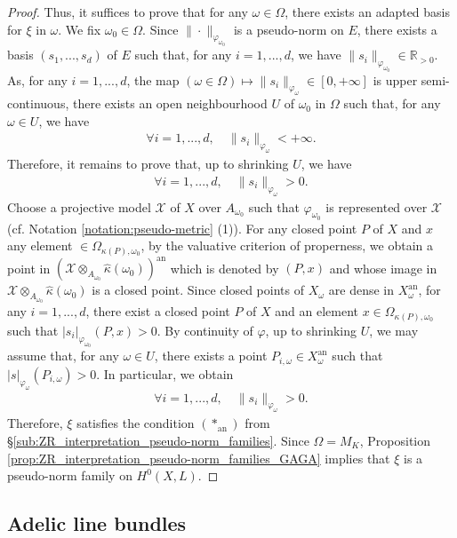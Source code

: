 \documentclass [11pt,reqno]{amsart}
\def\bR{{\mathbb{R}}}
\newcommand{\1}{\mathmybb{1}}
\def\cX{{\mathcal{X}}}
\def\an{\operatorname{an}}
\begin{document}
\begin{proof}
Thus, it suffices to prove that for any $\omega\in\Omega$, there exists an adapted basis for $\xi$ in $\omega$. We fix $\omega_{0}\in\Omega$. Since $\|\cdot\|_{\varphi_{\omega_{0}}}$ is a pseudo-norm on $E$, there exists a basis $(s_1,...,s_d)$ of $E$ such that, for any $i=1,...,d$, we have $\|s_i\|_{\varphi_{\omega_{0}}}\in\bR_{>0}$. As, for any $i=1,...,d$, the map $(\omega\in\Omega)\mapsto \|s_i\|_{\varphi_{\omega}}\in [0,+\infty]$ is upper semi-continuous, there exists an open neighbourhood $U$ of $\omega_{0}$ in $\Omega$ such that, for any $\omega\in U$, we have 
\begin{align*}
\forall i =1,...,d,\quad \|s_i\|_{\varphi_{\omega}} < +\infty.
\end{align*}  
Therefore, it remains to prove that, up to shrinking $U$, we have 
\begin{align*}
\forall i =1,...,d,\quad \|s_i\|_{\varphi_{\omega}} > 0.
\end{align*}
Choose a projective model $\cX$ of $X$ over $A_{\omega_{0}}$ such that $\varphi_{\omega_{0}}$ is represented over $\cX$ (cf. Notation \ref{notation:pseudo-metric} (1)). For any closed point $P$ of $X$ and $x$ any element $\in\Omega_{\kappa(P),\omega_0}$, by the valuative criterion of properness, we obtain a point in $(\cX\otimes_{A_{\omega_{0}}}\widehat{\kappa}(\omega_{0}))^{\an}$ which is denoted by $(P,x)$ and whose image in $\cX\otimes_{A_{\omega_{0}}}\widehat{\kappa}(\omega_{0})$ is a closed point. Since closed points of $X_{\omega}$ are dense in $X_{\omega}^{\an}$, for any $i=1,...,d$, there exist a closed point $P$ of $X$ and an element $x\in\Omega_{\kappa(P),\omega_0}$ such that $|s_i|_{\varphi_{\omega_{0}}}(P,x)>0$. By continuity of $\varphi$, up to shrinking $U$, we may assume that, for any $\omega\in U$, there exists a point $P_{i,\omega}\in X_{\omega}^{\an}$ such that $|s|_{\varphi_{\omega}}(P_{i,\omega})>0$. In particular, we obtain 
\begin{align*}
\forall i =1,...,d,\quad \|s_i\|_{\varphi_{\omega}} > 0.
\end{align*}
Therefore, $\xi$ satisfies the condition $(\ast_{\an})$ from \S \ref{sub:ZR_interpretation_pseudo-norm_families}. Since $\Omega=M_{K}$, Proposition \ref{prop:ZR_interpretation_pseudo-norm_families_GAGA} implies that $\xi$ is a pseudo-norm family on $H^{0}(X,L)$.
\end{proof}

\subsection{Adelic line bundles}
\label{sub:adelic_line_bundles}
\end{document}

